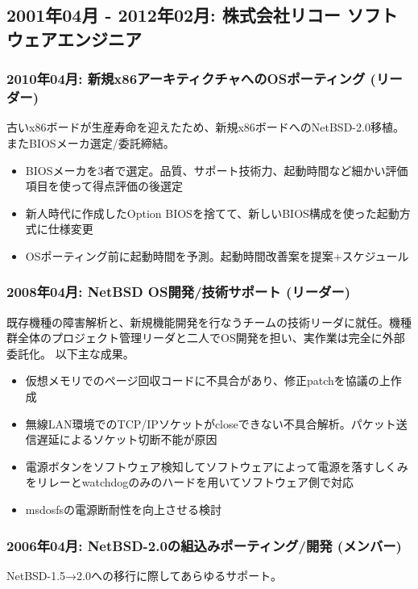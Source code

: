 \documentclass[letterpaper]{article}
\begin{document}
\subsection*{2001年04月 - 2012年02月: 株式会社リコー ソフトウェアエンジニア}
\subsubsection*{2010年04月: 新規x86アーキティクチャへのOSポーティング (リーダー)}
古いx86ボードが生産寿命を迎えたため、新規x86ボードへのNetBSD-2.0移植。またBIOSメーカ選定/委託締結。

\begin{itemize}
  \item BIOSメーカを3者で選定。品質、サポート技術力、起動時間など細かい評価項目を使って得点評価の後選定
  \item 新人時代に作成したOption BIOSを捨てて、新しいBIOS構成を使った起動方式に仕様変更
  \item OSポーティング前に起動時間を予測。起動時間改善案を提案+スケジュール
\end{itemize}

\subsubsection*{2008年04月: NetBSD OS開発/技術サポート (リーダー)}
既存機種の障害解析と、新規機能開発を行なうチームの技術リーダに就任。機種群全体のプロジェクト管理リーダと二人でOS開発を担い、実作業は完全に外部委託化。
以下主な成果。

\begin{itemize}
  \item 仮想メモリでのページ回収コードに不具合があり、修正patchを協議の上作成
  \item 無線LAN環境でのTCP/IPソケットがcloseできない不具合解析。パケット送信遅延によるソケット切断不能が原因
  \item 電源ボタンをソフトウェア検知してソフトウェアによって電源を落すしくみをリレーとwatchdogのみのハードを用いてソフトウェア側で対応
  \item msdosfsの電源断耐性を向上させる検討
\end{itemize}

\subsubsection*{2006年04月: NetBSD-2.0の組込みポーティング/開発 (メンバー)}
NetBSD-1.5→2.0への移行に際してあらゆるサポート。
\end{document}
